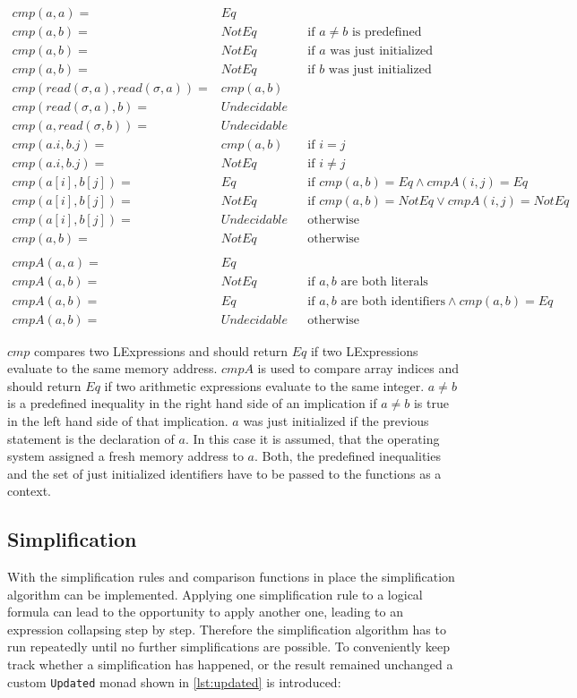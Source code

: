 \documentclass[12pt]{article}
\begin{document}
\begin{align*}
    cmp(a,a)= & Eq\\
    cmp(a,b)= & NotEq &  & \text{if }a\neq b\text{ is predefined}\\
    cmp(a,b)= & NotEq &  & \text{if }a\text{ was just initialized}\\
    cmp(a,b)= & NotEq &  & \text{if }b\text{ was just initialized}\\
    cmp(read(\sigma,a),read(\sigma,a))= & cmp(a,b)\\
    cmp(read(\sigma,a),b)= & Undecidable\\
    cmp(a,read(\sigma,b))= & Undecidable\\
    cmp(a.i,b.j)= & cmp(a,b) &  & \text{if }i=j\\
    cmp(a.i,b.j)= & NotEq &   & \text{if }i\neq j\\
    cmp(a[i],b[j])= & Eq &  & \text{if }cmp(a,b)=Eq\wedge cmpA(i,j)=Eq\\
    cmp(a[i],b[j])= & NotEq &  & \text{if }cmp(a,b)=NotEq\vee cmpA(i,j)=NotEq\\
    cmp(a[i],b[j])= & Undecidable &  & \text{otherwise}\\
    cmp(a,b)= & NotEq &  & \text{otherwise}\\
    \\
    cmpA(a,a)= & Eq\\
    cmpA(a,b)= & NotEq &  & \text{if }a,b\text{ are both literals}\\
    cmpA(a,b)= & Eq &  & \text{if }a,b\text{ are both identifiers}\wedge cmp(a,b)=Eq\\
    cmpA(a,b)= & Undecidable &  & \text{otherwise}
\end{align*}

$cmp$ compares two LExpressions and should return $Eq$ if two LExpressions evaluate to the same memory address.
$cmpA$ is used to compare array indices and should return $Eq$ if two arithmetic expressions evaluate to the same integer.
$a \neq b$ is a predefined inequality in the right hand side of an implication if $a \neq b$ is true in the left hand side of that implication. 
$a$ was just initialized if the previous statement is the declaration of $a$. 
In this case it is assumed, that the operating system assigned a fresh memory address to $a$.
Both, the predefined inequalities and the set of just initialized identifiers have to be passed to the functions as a context.

\subsection{Simplification}
\label{simplification}
With the simplification rules and comparison functions in place the simplification algorithm can be implemented.
Applying one simplification rule to a logical formula can lead to the opportunity to apply another one, leading to an expression collapsing step by step.
Therefore the simplification algorithm has to run repeatedly until no further simplifications are possible.
To conveniently keep track whether a simplification has happened, or the result remained unchanged a custom \texttt{Updated} monad shown in \ref{lst:updated} is introduced:
\end{document}
